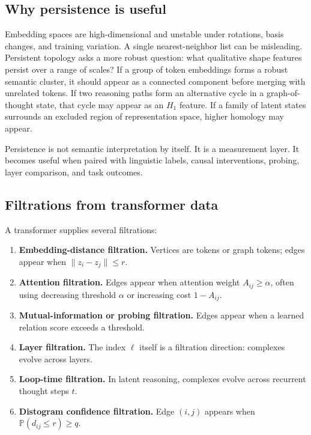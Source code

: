 \documentclass[11pt]{article}
\newcommand{\1}{\mathbf{1}}
\begin{document}
\subsection{Why persistence is useful}

Embedding spaces are high-dimensional and unstable under rotations, basis changes, and training variation. A single nearest-neighbor list can be misleading. Persistent topology asks a more robust question: what qualitative shape features persist over a range of scales? If a group of token embeddings forms a robust semantic cluster, it should appear as a connected component before merging with unrelated tokens. If two reasoning paths form an alternative cycle in a graph-of-thought state, that cycle may appear as an $H_1$ feature. If a family of latent states surrounds an excluded region of representation space, higher homology may appear.

Persistence is not semantic interpretation by itself. It is a measurement layer. It becomes useful when paired with linguistic labels, causal interventions, probing, layer comparison, and task outcomes.

\subsection{Filtrations from transformer data}

A transformer supplies several filtrations:

\begin{enumerate}
\item \textbf{Embedding-distance filtration.} Vertices are tokens or graph tokens; edges appear when $\|z_i-z_j\|\le r$.
\item \textbf{Attention filtration.} Edges appear when attention weight $A_{ij}\ge \alpha$, often using decreasing threshold $\alpha$ or increasing cost $1-A_{ij}$.
\item \textbf{Mutual-information or probing filtration.} Edges appear when a learned relation score exceeds a threshold.
\item \textbf{Layer filtration.} The index $\ell$ itself is a filtration direction: complexes evolve across layers.
\item \textbf{Loop-time filtration.} In latent reasoning, complexes evolve across recurrent thought steps $t$.
\item \textbf{Distogram confidence filtration.} Edge $(i,j)$ appears when $\mathbb{P}(d_{ij}\le r)\ge q$.
\end{enumerate}
\end{document}
